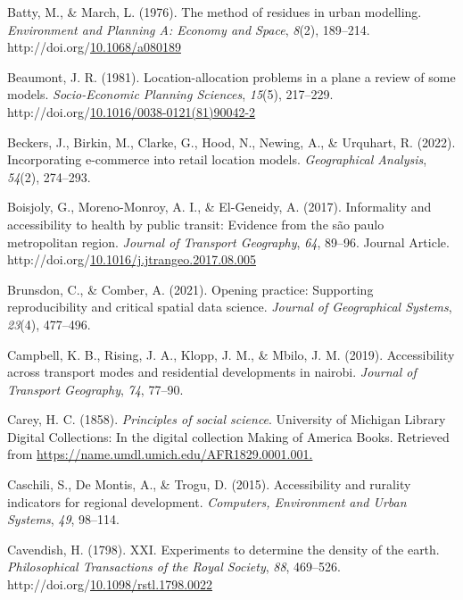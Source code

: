 \documentclass[
11pt, %
oneside, %
english, %
singlespacing, %
]{macthesis} %
\newlength{\cslhangindent}
\newenvironment{CSLReferences}[2] %
{\begin{list}{}{%
	\setlength{\itemindent}{0pt}
	\setlength{\leftmargin}{0pt}
	\setlength{\parsep}{0pt}
	\ifodd #1
	\setlength{\leftmargin}{\cslhangindent}
	\setlength{\itemindent}{-1\cslhangindent}
	\fi
	\setlength{\itemsep}{#2\baselineskip}}}
{\end{list}}
\begin{document}
\begin{CSLReferences}{1}{0}
Batty, M., \& March, L. (1976). The method of residues in urban modelling. \emph{Environment and Planning A: Economy and Space}, \emph{8}(2), 189--214. http://doi.org/\href{https://doi.org/10.1068/a080189}{10.1068/a080189}

Beaumont, J. R. (1981). Location-allocation problems in a plane a review of some models. \emph{Socio-Economic Planning Sciences}, \emph{15}(5), 217--229. http://doi.org/\href{https://doi.org/10.1016/0038-0121(81)90042-2}{10.1016/0038-0121(81)90042-2}

Beckers, J., Birkin, M., Clarke, G., Hood, N., Newing, A., \& Urquhart, R. (2022). Incorporating e-commerce into retail location models. \emph{Geographical Analysis}, \emph{54}(2), 274--293.

Boisjoly, G., Moreno-Monroy, A. I., \& El-Geneidy, A. (2017). Informality and accessibility to health by public transit: Evidence from the são paulo metropolitan region. \emph{Journal of Transport Geography}, \emph{64}, 89--96. Journal Article. http://doi.org/\href{https://doi.org/10.1016/j.jtrangeo.2017.08.005}{10.1016/j.jtrangeo.2017.08.005}

Brunsdon, C., \& Comber, A. (2021). Opening practice: Supporting reproducibility and critical spatial data science. \emph{Journal of Geographical Systems}, \emph{23}(4), 477--496.

Campbell, K. B., Rising, J. A., Klopp, J. M., \& Mbilo, J. M. (2019). Accessibility across transport modes and residential developments in nairobi. \emph{Journal of Transport Geography}, \emph{74}, 77--90.

Carey, H. C. (1858). \emph{Principles of social science}. University of Michigan Library Digital Collections: In the digital collection Making of America Books. Retrieved from \url{https://name.umdl.umich.edu/AFR1829.0001.001.}

Caschili, S., De Montis, A., \& Trogu, D. (2015). Accessibility and rurality indicators for regional development. \emph{Computers, Environment and Urban Systems}, \emph{49}, 98--114.

Cavendish, H. (1798). {XXI}. {Experiments} to determine the density of the earth. \emph{Philosophical Transactions of the Royal Society}, \emph{88}, 469--526. http://doi.org/\href{https://doi.org/10.1098/rstl.1798.0022}{10.1098/rstl.1798.0022}


\end{CSLReferences}
\end{document}
